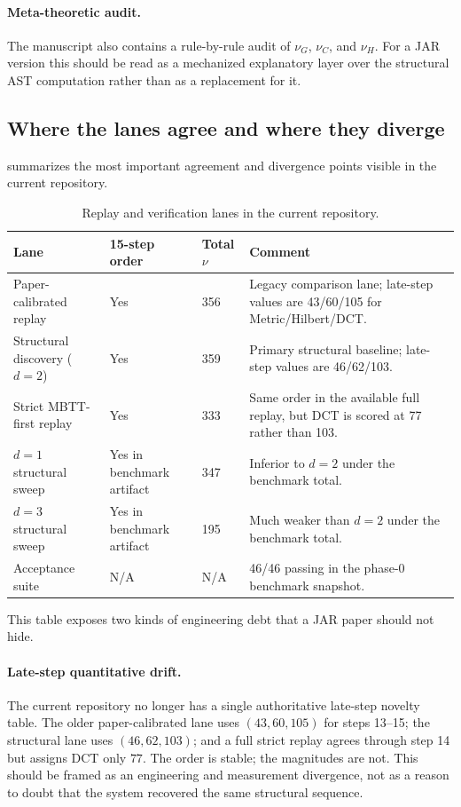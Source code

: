 \documentclass[11pt,a4paper]{article}
\begin{document}
\paragraph{Meta-theoretic audit.}
The manuscript also contains a rule-by-rule audit of $\nu_G$, $\nu_C$, and $\nu_H$. For a JAR version this should be read as a mechanized explanatory layer over the structural AST computation rather than as a replacement for it.

\subsection{Where the lanes agree and where they diverge}

 summarizes the most important agreement and divergence points visible in the current repository.

\begin{table}[H]
\centering
\caption{Replay and verification lanes in the current repository.}
\label{tab:lane-comparison}
\small
\begin{tabular}{@{}p{3.2cm}p{2.1cm}p{1.5cm}p{7.0cm}@{}}
\toprule
Lane & 15-step order & Total $\nu$ & Comment \\
\midrule
Paper-calibrated replay & Yes & 356 & Legacy comparison lane; late-step values are 43/60/105 for Metric/Hilbert/DCT. \\
Structural discovery ($d=2$) & Yes & 359 & Primary structural baseline; late-step values are 46/62/103. \\
Strict MBTT-first replay & Yes & 333 & Same order in the available full replay, but DCT is scored at 77 rather than 103. \\
$d=1$ structural sweep & Yes in benchmark artifact & 347 & Inferior to $d=2$ under the benchmark total. \\
$d=3$ structural sweep & Yes in benchmark artifact & 195 & Much weaker than $d=2$ under the benchmark total. \\
Acceptance suite & N/A & N/A & 46/46 passing in the phase-0 benchmark snapshot. \\
\bottomrule
\end{tabular}
\end{table}

This table exposes two kinds of engineering debt that a JAR paper should not hide.

\paragraph{Late-step quantitative drift.}
The current repository no longer has a single authoritative late-step novelty table. The older paper-calibrated lane uses $(43,60,105)$ for steps 13--15; the structural lane uses $(46,62,103)$; and a full strict replay agrees through step 14 but assigns DCT only $77$. The order is stable; the magnitudes are not. This should be framed as an engineering and measurement divergence, not as a reason to doubt that the system recovered the same structural sequence.
\end{document}
